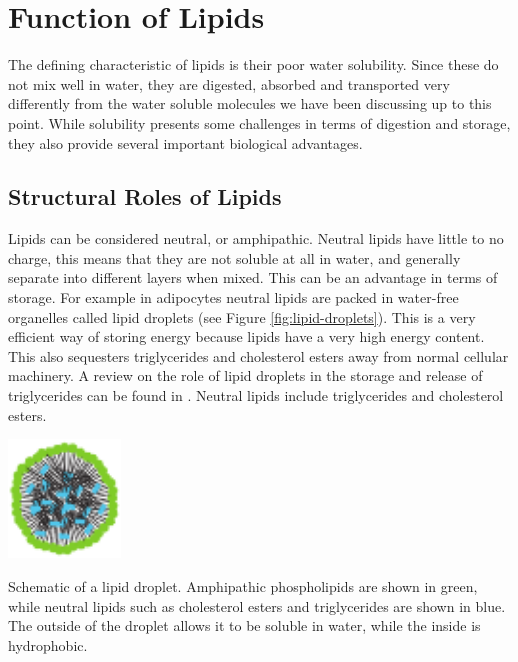 \documentclass{tufte-handout}
\begin{document}
\section{Function of Lipids}

The defining characteristic of lipids is their poor water solubility.  Since these do not mix well in water, they are digested, absorbed and transported very differently from the water soluble molecules we have been discussing up to this point.  While solubility presents some challenges in terms of digestion and storage, they also provide several important biological advantages.

\subsection{Structural Roles of Lipids}

Lipids can be considered neutral, or amphipathic.  Neutral lipids have little to no charge, this means that they are not soluble at all in water, and generally separate into different layers when mixed.  This can be an advantage in terms of storage.  For example in adipocytes neutral lipids are packed in water-free organelles called lipid droplets (see Figure \ref{fig:lipid-droplets}).  This is a very efficient way of storing energy because lipids have a very high energy content.  This also sequesters triglycerides  and cholesterol esters away from normal cellular machinery.  A review on the role of lipid droplets in the storage and release of triglycerides can be found in \citet{Walther2009}.  Neutral lipids include triglycerides and cholesterol esters.  

\begin{marginfigure}
\includegraphics[width=3cm]{figures/lipid-droplets.pdf}
\caption{Schematic of a lipid droplet.  Amphipathic phospholipids are shown in green, while neutral lipids such as cholesterol esters and triglycerides are shown in blue.  The outside of the droplet allows it to be soluble in water, while the inside is hydrophobic.}
\label{fig:lipid-droplets}
\end{marginfigure}
\end{document}
